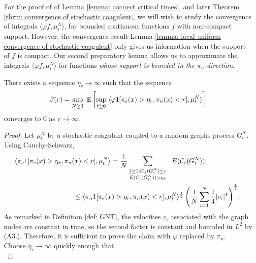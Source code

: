 For the proof of of Lemma \ref{lemma: connect critical times}, and later Theorem \ref{thrm: convergence of stochastic coagulent}, we will wish to study the convergence of integrals $\langle \varphi f, \mu^N_t\rangle$, for bounded continuous functions $f$ with non-compact support. However, the convergence result Lemma \ref{lemma: local uniform convergence of stochastic coagulent} only gives us information when the support of $f$ is compact. Our second preparatory lemma allows us to approximate the integrals $\langle \varphi f, \mu^N_t\rangle$ for functions \emph{whose support is bounded in the $\pi_n$-direction}.

\iffalse \begin{lemma}\label{lemma: etar} There exists a sequence $\eta_r \rightarrow \infty$ such that the sequence \begin{equation}
    \beta(r)=\sup_{N\geq 1} \hspace{0.1cm} \mathbb{E}\left[\sup_{t\geq 0}\hspace{0.1cm}\langle \varphi 1[\pi_e(x)>\eta_r, \pi_n(x)< r], \mu^N_t\rangle \right]
\end{equation} converges to $0$ as $r \rightarrow \infty.$ \end{lemma} \begin{proof} Let $\mu^N_t$ be a stochastic coagulant coupled to a random graphs process $G^N_t$. Using Cauchy-Schwarz, \begin{equation} \begin{split}
  & \langle \pi_e 1[\pi_e(x)>\eta_r, \pi_n(x)< r], \mu^N_t\rangle  = \frac{1}{N} \sum_{\substack{j\geq 1: C_j(G^N_t)\le r \\ E(\mathcal{C}_j(G^N_t))>\eta_r}} \hspace{0.2cm} E(\mathcal{C}_j(G^N_t))  %
   \\ & \hspace{3cm} \leq \langle \pi_n 1[\pi_e(x)>\eta_r, \pi_n(x)< r], \mu^N_t\rangle^\frac{1}{2}\left(\frac{1}{N}\sum_{i=1}^N \frac{1}{4}|v_i|^4\right)^\frac{1}{2}.
\end{split} \end{equation}
As remarked in Definition \ref{def: GNT}, the velocities $v_i$ associated with the graph nodes are constant in time, so the second factor is constant and bounded in $L^2$ by ({A3.}). Therefore, it is sufficient to prove the claim with $\varphi$ replaced by $\pi_n.$ \medskip \\ Choose $\eta_r\rightarrow \infty$ quickly enough that \begin{equation} \label{eq: choice of etar}

\end{equation}
\end{proof}
